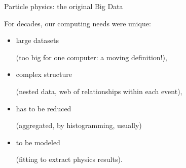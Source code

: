 \documentclass[aspectratio=169]{beamer}
\begin{document}
\begin{frame}{Particle physics: the original Big Data}
\vspace{0.5 cm}

\large For decades, our computing needs were unique:

\vspace{0.1 cm}
\begin{itemize}
\item large datasets \hfill \begin{minipage}{0.7\linewidth}(too big for one computer: a moving definition!),\end{minipage}
\item complex structure \hfill \begin{minipage}{0.7\linewidth}(nested data, web of relationships within each event),\end{minipage}
\item has to be reduced \hfill \begin{minipage}{0.7\linewidth}(aggregated, by histogramming, usually)\end{minipage}
\item to be modeled \hfill \begin{minipage}{0.7\linewidth}(fitting to extract physics results).\end{minipage}
\end{itemize}

\vspace{0.5 cm}
\end{frame}
\end{document}
